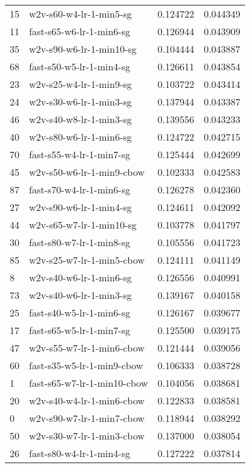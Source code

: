 \begin{tabular}{llrr}
15 &      w2v-s60-w4-lr-1-min5-sg &  0.124722 &  0.044349 \\
11 &     fast-s65-w6-lr-1-min6-sg &  0.126944 &  0.043909 \\
35 &     w2v-s90-w6-lr-1-min10-sg &  0.104444 &  0.043887 \\
68 &     fast-s50-w5-lr-1-min4-sg &  0.126611 &  0.043854 \\
23 &      w2v-s25-w4-lr-1-min9-sg &  0.103722 &  0.043414 \\
24 &      w2v-s30-w6-lr-1-min3-sg &  0.137944 &  0.043387 \\
46 &      w2v-s40-w8-lr-1-min3-sg &  0.139556 &  0.043233 \\
40 &      w2v-s80-w6-lr-1-min6-sg &  0.124722 &  0.042715 \\
70 &     fast-s55-w4-lr-1-min7-sg &  0.125444 &  0.042699 \\
45 &    w2v-s50-w6-lr-1-min9-cbow &  0.102333 &  0.042583 \\
87 &     fast-s70-w4-lr-1-min6-sg &  0.126278 &  0.042360 \\
27 &      w2v-s90-w6-lr-1-min4-sg &  0.124611 &  0.042092 \\
44 &     w2v-s65-w7-lr-1-min10-sg &  0.103778 &  0.041797 \\
30 &     fast-s80-w7-lr-1-min8-sg &  0.105556 &  0.041723 \\
85 &    w2v-s25-w7-lr-1-min5-cbow &  0.124111 &  0.041149 \\
8  &      w2v-s40-w6-lr-1-min6-sg &  0.126556 &  0.040991 \\
73 &      w2v-s40-w6-lr-1-min3-sg &  0.139167 &  0.040158 \\
25 &     fast-s40-w5-lr-1-min6-sg &  0.126167 &  0.039677 \\
17 &     fast-s65-w5-lr-1-min7-sg &  0.125500 &  0.039175 \\
47 &    w2v-s55-w7-lr-1-min6-cbow &  0.121444 &  0.039056 \\
60 &   fast-s35-w5-lr-1-min9-cbow &  0.106333 &  0.038728 \\
1  &  fast-s65-w7-lr-1-min10-cbow &  0.104056 &  0.038681 \\
20 &    w2v-s40-w4-lr-1-min6-cbow &  0.122833 &  0.038581 \\
0  &    w2v-s90-w7-lr-1-min7-cbow &  0.118944 &  0.038292 \\
50 &    w2v-s30-w7-lr-1-min3-cbow &  0.137000 &  0.038054 \\
26 &     fast-s80-w4-lr-1-min4-sg &  0.127222 &  0.037814 \\

\end{tabular}
